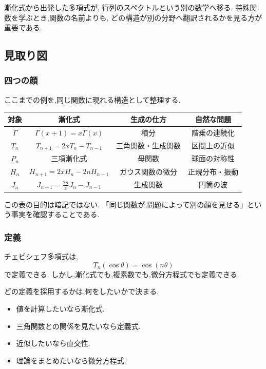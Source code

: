 漸化式から出発した多項式が,
行列のスペクトルという別の数学へ移る.
特殊関数を学ぶとき,関数の名前よりも,
どの構造が別の分野へ翻訳されるかを見る方が重要である.

\subsection{見取り図}

\subsubsection{四つの顔}

ここまでの例を,同じ関数に現れる構造として整理する.

\begin{center}
\begin{tabular}{c|c|c|c}
  対象 & 漸化式 & 生成の仕方 & 自然な問題\\ \hline
  $\Gamma$ & $\Gamma(x+1)=x\Gamma(x)$
    & 積分 & 階乗の連続化\\
  $T_n$ & $T_{n+1}=2xT_n-T_{n-1}$
    & 三角関数・生成関数 & 区間上の近似\\
  $P_n$ & 三項漸化式
    & 母関数 & 球面の対称性\\
  $H_n$ & $H_{n+1}=2xH_n-2nH_{n-1}$
    & ガウス関数の微分 & 正規分布・振動\\
  $J_n$ & $J_{n+1}=\frac{2n}{x}J_n-J_{n-1}$
    & 生成関数 & 円筒の波\\
\end{tabular}
\end{center}

この表の目的は暗記ではない.
「同じ関数が,問題によって別の顔を見せる」という事実を確認することである.

\subsubsection{定義}

チェビシェフ多項式は,
\[
  T_n(\cos\theta)=\cos(n\theta)
\]
で定義できる.
しかし,漸化式でも,複素数でも,微分方程式でも定義できる.

どの定義を採用するかは,何をしたいかで決まる.

\begin{itemize}
  \item 値を計算したいなら漸化式.
  \item 三角関数との関係を見たいなら定義式.
  \item 近似したいなら直交性.
  \item 理論をまとめたいなら微分方程式.
\end{itemize}

